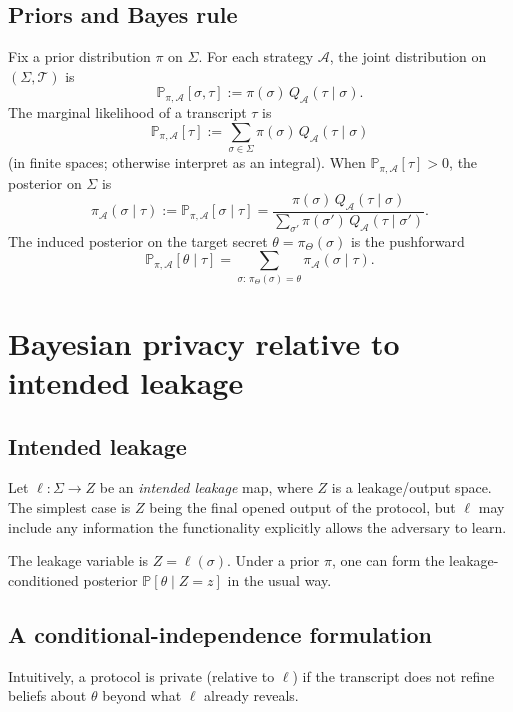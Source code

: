 \documentclass[11pt,a4paper]{article}
\theoremstyle{definition}
\theoremstyle{remark}
\newcommand{\Prb}{\mathbb{P}}
\newcommand{\Leak}{\ell}
\newcommand{\post}{\pi}
\newcommand{\Tau}{\mathcal{T}}
\begin{document}
\subsection{Priors and Bayes rule}
Fix a prior distribution \(\post\) on \(\Sigma\).
For each strategy \(\mathcal{A}\), the joint distribution on \((\Sigma,\Tau)\) is
\[
\Prb_{\post,\mathcal{A}}[\sigma,\tau] := \post(\sigma)\,Q_{\mathcal{A}}(\tau\mid\sigma).
\]
The marginal likelihood of a transcript \(\tau\) is
\[
\Prb_{\post,\mathcal{A}}[\tau] := \sum_{\sigma\in\Sigma} \post(\sigma)\,Q_{\mathcal{A}}(\tau\mid\sigma)
\]
(in finite spaces; otherwise interpret as an integral).
When \(\Prb_{\post,\mathcal{A}}[\tau]>0\), the posterior on \(\Sigma\) is
\begin{equation}
\label{eq:posterior-sigma}
\post_{\mathcal{A}}(\sigma\mid\tau)
:=
\Prb_{\post,\mathcal{A}}[\sigma\mid\tau]
=
\frac{\post(\sigma)\,Q_{\mathcal{A}}(\tau\mid\sigma)}{\sum_{\sigma'} \post(\sigma')\,Q_{\mathcal{A}}(\tau\mid\sigma')}.
\end{equation}
The induced posterior on the target secret \(\theta=\pi_\Theta(\sigma)\) is the pushforward
\[
\Prb_{\post,\mathcal{A}}[\theta\mid\tau]
=
\sum_{\sigma:\,\pi_\Theta(\sigma)=\theta}
\post_{\mathcal{A}}(\sigma\mid\tau).
\]

\section{Bayesian privacy relative to intended leakage}
\label{sec:bayes-privacy}

\subsection{Intended leakage}
Let \(\Leak : \Sigma \to Z\) be an \emph{intended leakage} map, where \(Z\) is a leakage/output space.
The simplest case is \(Z\) being the final opened output of the protocol, but \(\Leak\) may include any information the functionality explicitly allows the adversary to learn.

The leakage variable is \(Z=\Leak(\sigma)\). Under a prior \(\post\), one can form the leakage-conditioned posterior \(\Prb[\theta\mid Z=z]\) in the usual way.

\subsection{A conditional-independence formulation}
Intuitively, a protocol is private (relative to \(\Leak\)) if the transcript does not refine beliefs about \(\theta\) beyond what \(\Leak\) already reveals.
\end{document}
